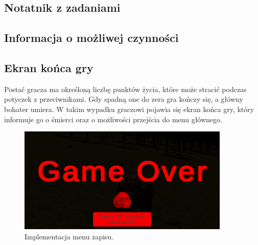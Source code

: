 \subsection{Notatnik z zadaniami}

\subsection{Informacja o możliwej czynności}

\subsection{Ekran końca gry}
Postać gracza ma określoną liczbę punktów życia, które może stracić podczas potyczek z przeciwnikami. Gdy spadną one do zera gra kończy się, a główny bohater umiera.
W takim wypadku graczowi pojawia się ekran końca gry, który informuje go o śmierci oraz o możliwości przejścia do menu głównego.
\begin{figure}[htbp]
    \centering
    \includegraphics[width=0.9\textwidth]{images/ui/endgame_screen.png}
    \caption{Implementacja menu zapisu.}\label{fig:end_sc}
\end{figure}